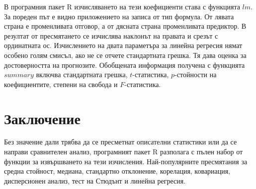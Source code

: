 В програмния пакет R изчисляването на тези коефициенти става с функцията $lm$. За пореден път е видно приложението на записа от тип формула. От лявата страна е променливата отговор, а от дясната страна променливата предиктор. В резултат от пресмятането се изчислява наклонът на правата и срезът с ординатната ос. Изчислението на двата параметъра за линейна регресия нямат особено голям смисъл, ако не се отчете стандартната грешка. Тя дава оценка за достоверността на прогнозите. Обобщената информация получена с функцията $summary$ включва стандартната грешка, $t$-статистика, $p$-стойности на коефициентите, степени на свобода и $F$-статистика.

\section*{Заключение}

Без значение дали трябва да се пресметнат описателни статистики или да се направи сравнителен анализ, програмният пакет R разполага с пълен набор от функции за извършването на тези изчисления. Най-популярните пресмятания за средна стойност, медиана, стандартно отклонение, корелация, ковариация, дисперсионен анализ, тест на Стюдънт и линейна регресия. 

